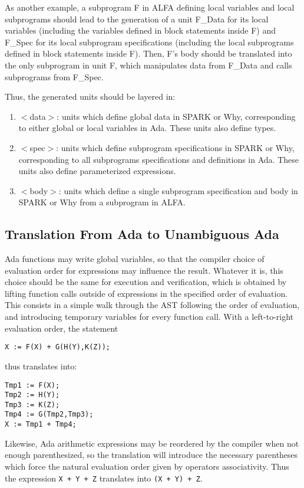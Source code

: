 \documentclass[fullpage]{article}
\newcounter{example}
\begin{document}
As another example, a subprogram F in ALFA defining local variables and local
subprograms should lead to the generation of a unit F\_Data for its local
variables (including the variables defined in block statements inside F) and
F\_Spec for its local subprogram specifications (including the local
subprograms defined in block statements inside F). Then, F's body should be
translated into the only subprogram in unit F, which manipulates data from
F\_Data and calls subprograms from F\_Spec.

Thus, the generated units should be layered in:
\begin{enumerate}
\item $<$data$>$: units which define global data in SPARK or Why, corresponding
  to either global or local variables in Ada. These units also define types.
\item $<$spec$>$: units which define subprogram specifications in SPARK or Why,
  corresponding to all subprograms specifications and definitions in Ada. These
  units also define parameterized expressions.
\item $<$body$>$: units which define a single subprogram specification and body
  in SPARK or Why from a subprogram in ALFA.
\end{enumerate}

\subsection{Translation From Ada to Unambiguous Ada}

Ada functions may write global variables, so that the compiler choice of
evaluation order for expressions may influence the result. Whatever it is, this
choice should be the same for execution and verification, which is obtained by
lifting function calls outside of expressions in the specified order of
evaluation. This consists in a simple walk through the AST following the order
of evaluation, and introducing temporary variables for every function
call. With a left-to-right evaluation order, the statement
\begin{verbatim}
X := F(X) + G(H(Y),K(Z));
\end{verbatim}
thus translates into:
\begin{verbatim}
Tmp1 := F(X);
Tmp2 := H(Y);
Tmp3 := K(Z);
Tmp4 := G(Tmp2,Tmp3);
X := Tmp1 + Tmp4;
\end{verbatim}

Likewise, Ada arithmetic expressions may be reordered by the compiler when not
enough parenthesized, so the translation will introduce the necessary
parentheses which force the natural evaluation order given by operators
associativity. Thus the expression \verb|X + Y + Z| translates into
\verb|(X + Y) + Z|.
\end{document}
